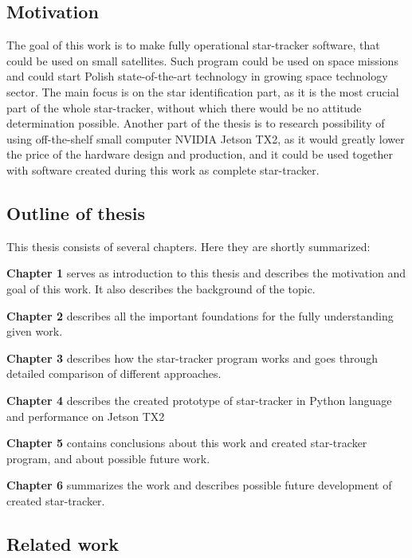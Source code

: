 \documentclass[12pt,a4paper,twoside]{article}
\begin{document}
\subsection{Motivation}
The goal of this work is to make fully operational star-tracker software, that could be used on small satellites. Such program could be used on space missions and could start Polish state-of-the-art technology in growing space technology sector. The main focus is on the star identification part, as it is the most crucial part of the whole star-tracker, without which there would be no attitude determination possible.
Another part of the thesis is to research possibility of using off-the-shelf small computer NVIDIA Jetson TX2, as it would greatly lower the price of the hardware design and production, and it could be used together with software created during this work as complete star-tracker.

\newpage

\subsection{Outline of thesis}

This thesis consists of several chapters. Here they are shortly summarized:\par
\setlength{\parindent}{0cm}
\textbf{Chapter 1} serves as introduction to this thesis and describes the motivation and goal of this work. It also describes the background of the topic.\par
\textbf{Chapter 2} describes all the important foundations for the fully understanding given work.\par
\textbf{Chapter 3} describes how the star-tracker program works and goes through detailed comparison of different approaches.\par
\textbf{Chapter 4} describes the created prototype of star-tracker in Python language and performance on Jetson TX2\par
\textbf{Chapter 5} contains conclusions about this work and created star-tracker program, and about possible future work.\par
\textbf{Chapter 6} summarizes the work and describes possible future development of created star-tracker.\par

\setlength{\parindent}{1cm}

\subsection{Related work}
\end{document}
